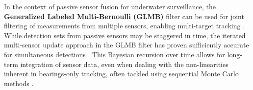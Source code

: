 In the context of passive sensor fusion for underwater surveillance, the \textbf{Generalized Labeled Multi-Bernoulli (GLMB)} filter can be used for joint filtering of measurements from multiple sensors, enabling multi-target tracking \cite{uney2022passive}. While detection sets from passive sensors may be staggered in time, the iterated multi-sensor update approach in the GLMB filter has proven sufficiently accurate for simultaneous detections \cite{uney2022passive}. This Bayesian recursion over time allows for long-term integration of sensor data, even when dealing with the non-linearities inherent in bearings-only tracking, often tackled using sequential Monte Carlo methods \cite{uney2022passive}.


\endinput